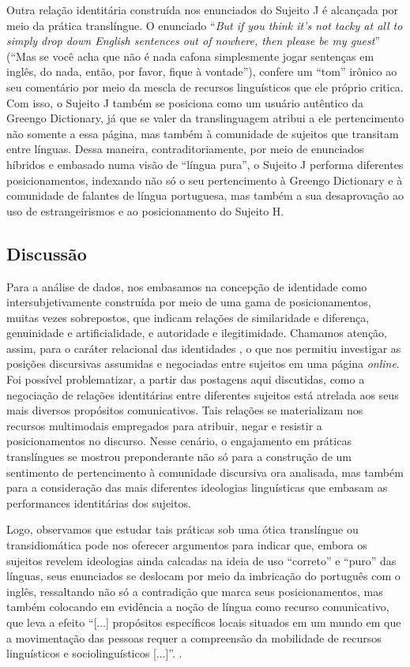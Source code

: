 \documentclass[portuguese]{textolivre}
\begin{document}
Outra relação identitária construída nos enunciados do Sujeito J é alcançada por meio da prática translíngue. O enunciado “\textit{But if you think it’s not tacky at all to simply drop down English sentences out of nowhere, then please be my guest}” (“Mas se você acha que não é nada cafona simplesmente jogar sentenças em inglês, do nada, então, por favor, fique à vontade”), confere um “tom” irônico ao seu comentário por meio da mescla de recursos linguísticos que ele próprio critica. Com isso, o Sujeito J também se posiciona como um usuário autêntico da Greengo Dictionary, já que se valer da translinguagem atribui a ele pertencimento não somente a essa página, mas também à comunidade de sujeitos que transitam entre línguas. Dessa maneira, contraditoriamente, por meio de enunciados híbridos e embasado numa visão de “língua pura”, o Sujeito J performa diferentes posicionamentos, indexando não só o seu pertencimento à Greengo Dictionary e à comunidade de falantes de língua portuguesa, mas também a sua desaprovação ao uso de estrangeirismos e ao posicionamento do Sujeito H.

\subsection{Discussão}\label{sec-formato}
Para a análise de dados, nos embasamos na concepção de identidade como intersubjetivamente construída por meio de uma gama de posicionamentos, muitas vezes sobrepostos, que indicam relações de similaridade e diferença, genuinidade e artificialidade, e autoridade e ilegitimidade. Chamamos atenção, assim, para o caráter relacional das identidades \cite{bucholtz_identity_2005}, o que nos permitiu investigar as posições discursivas assumidas e negociadas entre sujeitos em uma página \textit{online}. Foi possível problematizar, a partir das postagens aqui discutidas, como a negociação de relações identitárias entre diferentes sujeitos está atrelada aos seus mais diversos propósitos comunicativos. Tais relações se materializam nos recursos multimodais empregados para atribuir, negar e resistir a posicionamentos no discurso. Nesse cenário, o engajamento em práticas translíngues \cite{canagarajah_translingual_2013} se mostrou preponderante não só para a construção de um sentimento de pertencimento à comunidade discursiva ora analisada, mas também para a consideração das mais diferentes ideologias linguísticas que embasam as performances identitárias dos sujeitos.			

Logo, observamos que estudar tais práticas sob uma ótica translíngue ou transidiomática \cite{moita_lopes_ideologia_2013} pode nos oferecer argumentos para indicar que, embora os sujeitos revelem ideologias ainda calcadas na ideia de uso “correto” e “puro” das línguas, seus enunciados se deslocam por meio da imbricação do português com o inglês, ressaltando não só a contradição que marca seus posicionamentos, mas também colocando em evidência a noção de língua como recurso comunicativo, que leva a efeito “[...] propósitos específicos locais situados em um mundo em que a movimentação das pessoas requer a compreensão da mobilidade de recursos linguísticos e sociolinguísticos [...]”. \cite[p. 113]{moita_lopes_ideologia_2013}. 	
\end{document}
